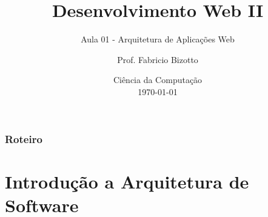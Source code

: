 \documentclass[
	10pt, %
	t, %
]{beamer}
\title[DesWebII]{Desenvolvimento Web II} %
\subtitle{Aula 01 - Arquitetura de Aplicações Web} %
\author[Fabricio Bizotto]{Prof. Fabricio Bizotto} %
\institute[IFC]{Instituto Federal Catarinense \\ \smallskip \textit{fabricio.bizotto@ifc.edu.br}} %
\date[\today]{Ciência da Computação \\ \today} %
\begin{document}

\begin{frame}
	\titlepage %
\end{frame}


\begin{frame}
	\frametitle{Roteiro} %
	
	\tableofcontents %
\end{frame}


\section{Introdução a Arquitetura de Software} %
\end{document}
